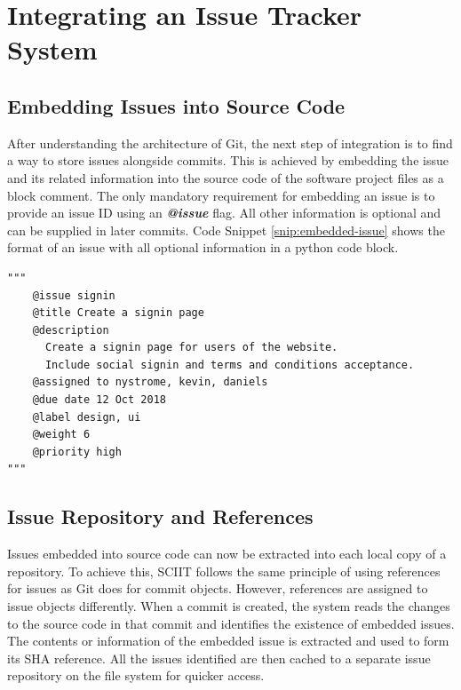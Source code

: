 \documentclass{mproj}
\newenvironment{code}{\captionsetup{type=listing}}{}
\begin{document}
\section{Integrating an Issue Tracker System}

\subsection{Embedding Issues into Source Code}

After understanding the architecture of Git, the next step of integration is to find a way to store issues alongside commits. This is achieved by embedding the issue and its related information into the source code of the software project files as a block comment. The only mandatory requirement for embedding an issue is to provide an issue ID using an \textbf{\textit{@issue}} flag. All other information is optional and can be supplied in later commits. Code Snippet \ref{snip:embedded-issue} shows the format of an issue with all optional information in a python code block.

\begin{code}
\label{snip:embedded-issue}
\begin{verbatim}
"""
    @issue signin
    @title Create a signin page
    @description
      Create a signin page for users of the website. 
      Include social signin and terms and conditions acceptance.
    @assigned to nystrome, kevin, daniels
    @due date 12 Oct 2018
    @label design, ui
    @weight 6
    @priority high    
"""
\end{verbatim}
\end{code}




\subsection{Issue Repository and References}

Issues embedded into source code can now be extracted into each local copy of a repository. To achieve this, SCIIT follows the same principle of using references for issues as Git does for commit objects. However, references are assigned to issue objects differently. When a commit is created, the system reads the changes to the source code in that commit and identifies the existence of embedded issues. The contents or information of the embedded issue is extracted and used to form its SHA reference. All the issues identified are then cached to a separate issue repository on the file system for quicker access.
\end{document}
